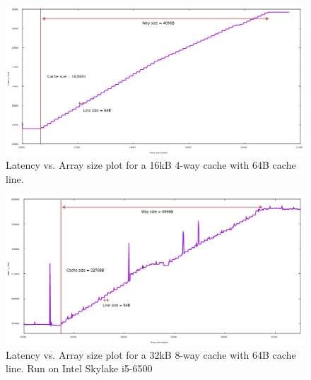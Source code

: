 \begin{figure}[h]
\centering
\includegraphics[width=\textwidth]{figures/reverse_eng_16kb}
\caption[1KB cache stride access]{Latency vs. Array size plot
    for a 16kB 4-way cache with 64B cache line.}
\label{fig:gem5_cache2}
\end{figure}

\begin{figure}[h]
\centering
\includegraphics[width=\textwidth]{figures/reverse_eng_32kb}
\caption[1KB cache stride access]{Latency vs. Array size plot
    for a 32kB 8-way cache with 64B cache line. Run on Intel Skylake i5-6500}
\label{fig:x86_cache}
\end{figure}


